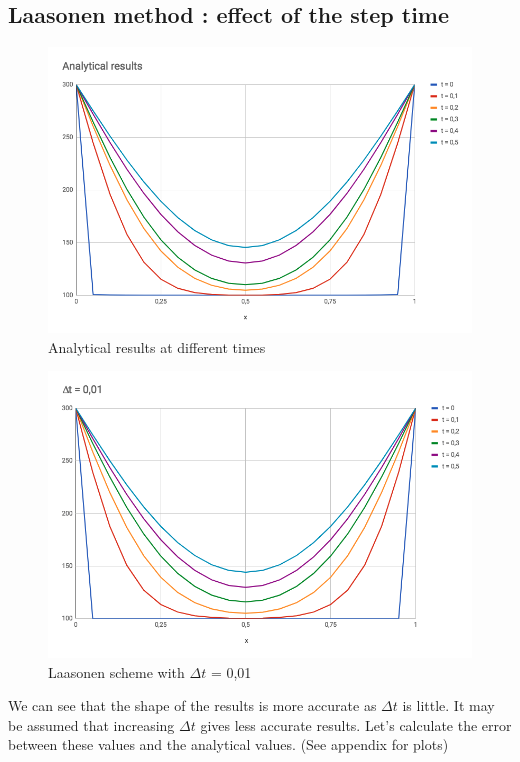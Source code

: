 \documentclass{article}
\begin{document}
        \subsection{Laasonen method : effect of the step time}
        \begin{figure}[H]
            \includegraphics[width=\textwidth]{analytical.png}
            \caption{Analytical results at different times}
        \end{figure}
        \begin{figure}[H]
            \includegraphics[width=\textwidth]{las-1.png}
            \caption{Laasonen scheme with $\Delta t$ = 0,01}
        \end{figure}
        
        We can see that the shape of the results is more accurate as $\Delta t$ is little.
        It may be assumed that increasing $\Delta t$ gives less accurate results.
        Let's calculate the error between these values and the analytical values. (See appendix for plots)
\end{document}
